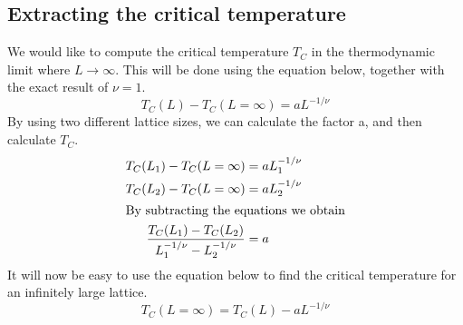 \documentclass[../main.tex]{subfiles}
\begin{document}
\subsection{Extracting the critical temperature}
We would like to compute the critical temperature $T_C$ in the thermodynamic limit where $L \rightarrow \infty$. This will be done using the equation below, together with the exact result of $\nu = 1$.
\[T_C(L) - T_C(L = \infty) = aL^{-1/\nu}\]
By using two different lattice sizes, we can calculate the factor a, and then calculate  $T_C$.
\begin{align*}
  T_C(L_1) - T_C(L = \infty) &= aL_1^{-1/\nu}\\
  T_C(L_2) - T_C(L = \infty) &= aL_2^{-1/\nu}\\
  \intertext{By subtracting the equations we obtain}
  \frac{T_C(L_1) - T_C(L_2)}{L_1^{-1/\nu} - L_2^{-1/\nu}} &= a
\end{align*}
It will now be easy to use the equation below to find the critical temperature for an infinitely large lattice.
\[T_C(L = \infty) = T_C(L) - aL^{-1/\nu}\]
\end{document}

